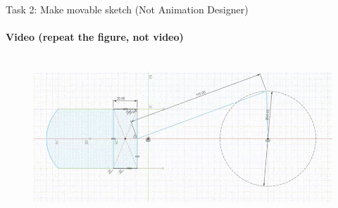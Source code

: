 \documentclass[aspectratio=169]{beamer}
\begin{document}
\begin{frame}[t]{Task 2: Make movable sketch (Not Animation Designer)}
    \framesubtitle{Video (repeat the figure, not video)}
    \vspace{-0.6cm}
    \begin{figure}[H]
        \href{https://youtu.be/KohY2-krw1I}{
            \centering\includegraphics[height=6cm,width=1\textwidth,keepaspectratio]{resources/task_2.png}}
        \label{fig:task_2.png}
    \end{figure}
\end{frame}
\end{document}

